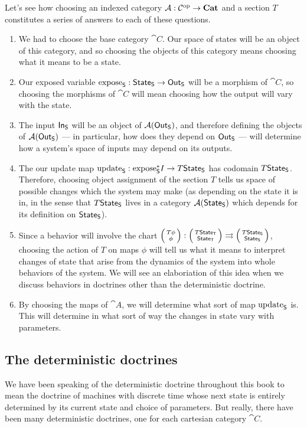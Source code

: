 \documentclass[DynamicalBook]{subfiles}
\begin{document}
Let's see how choosing an indexed category $\mathcal{A} : \mathcal{C}^{\textnormal{op}} \to \textbf{Cat}$
and a section $T$ constitutes a series of answers to each of these questions.
\begin{enumerate}
  \item We had to choose the base category $\cat{C}$. Our space of states will
    be an object of this category, and so choosing the objects of this category means choosing
    what it means to be a state.
  \item Our exposed variable $\mathrm{expose}_{\mathsf{S}} : \mathsf{State}_{\mathsf{S}} \to \mathsf{Out}_{\mathsf{S}}$ will be a
    morphism of $\cat{C}$, so choosing the morphisms of $\cat{C}$ will mean
    choosing how the output will vary with the state.
  \item The input $\mathsf{In}_{\mathsf{S}}$ will be an object of $\mathcal{A}(\mathsf{Out}_{\mathsf{S}})$, and
    therefore defining the objects of $\mathcal{A}(\mathsf{Out}_{\mathsf{S}})$ --- in particular, how
    does they 
    depend on $\mathsf{Out}_{\mathsf{S}}$ --- will determine how a system's space of inputs may
    depend on its outputs.
  \item The our update map $\mathrm{update}_{\mathsf{S}} : \mathrm{expose}_{\mathsf{S}}^{\ast} I \to T\mathsf{State}_{\mathsf{S}}$
    has codomain $T\mathsf{State}_{\mathsf{S}}$. Therefore, choosing object assignment of the
    section $T$ tells us space of possible changes which the system may make (as
    depending on the state it is in, in the sense that $T\mathsf{State}_{\mathsf{S}}$ lives in a
    category $\mathcal{A}(\mathsf{State}_{\mathsf{S}})$ which depends for its definition on $\mathsf{State}_{\mathsf{S}}$).
  \item Since a behavior will involve the chart $\lens{T\phi}{\phi} :
    \lens{T\State{T}}{\State{T}} \rightrightarrows
    \lens{T\State{S}}{\State{S}}$, choosing the action of $T$ on maps $\phi$
    will tell us what it means to interpret changes of state that arise from the
    dynamics of the system into whole behaviors of the system. We will see an
    elaboriation of this idea when we discuss behaviors in doctrines other than
    the deterministic doctrine.
  \item By choosing the maps of $\cat{A}$, we will determine what sort of map
    $\mathrm{update}_{\mathsf{S}}$ is. This will determine in what sort of way the changes in
    state vary with parameters.
\end{enumerate}

\subsection{The deterministic doctrines}

We have been speaking of the deterministic doctrine throughout this book to mean
the doctrine of machines with discrete time whose next state is entirely
determined by its current state and choice of parameters. But really, there have
been many deterministic doctrines, one for each cartesian category $\cat{C}$.
\end{document}
